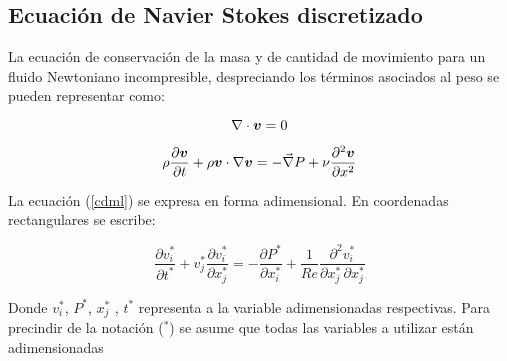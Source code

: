 \subsection{Ecuación de Navier Stokes discretizado}

La ecuación de conservación de la masa y de cantidad de movimiento para un fluido Newtoniano incompresible, despreciando los términos asociados al peso se pueden representar como:

\begin{equation}
\nabla \cdot \boldsymbol{v} = 0
\end{equation}

\begin{equation} \label{cdml}
\rho \dfrac{\partial \boldsymbol{v}}{ \partial t} + \rho \boldsymbol{v} \cdot \nabla \boldsymbol{v} = - \vec{\nabla} P + \nu \dfrac{ \partial^2 \boldsymbol{v} }{ \partial x^2 }
\end{equation}

La ecuación (\ref{cdml}) se expresa en forma adimensional. En coordenadas rectangulares se escribe:

\begin{equation}
\dfrac{\partial v_i^*}{\partial t^*} + v_j^* \dfrac{\partial v_i^*}{\partial x_j^*} = - \dfrac{\partial P^*}{\partial x_i^*} + \dfrac{1}{Re} \dfrac{\partial^2 v_i^*}{\partial x_j^* \, \partial x_j^*}
\end{equation}

Donde $v_i^*$, $P^*$, $x_j^*$ , $t^*$ representa a la variable adimensionadas respectivas. Para precindir de la notación ($^*$) se asume que todas las variables a utilizar están adimensionadas